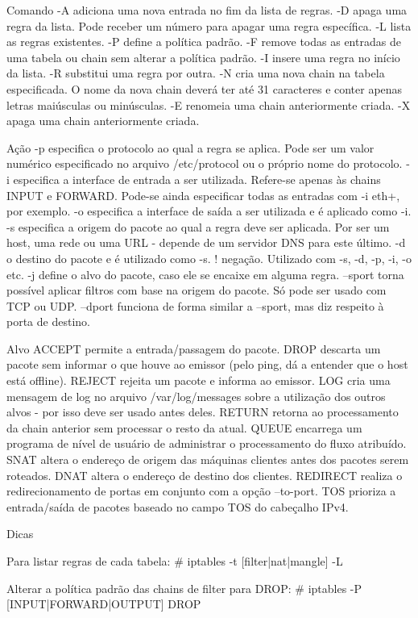 Comando
-A adiciona uma nova entrada no fim da lista de regras.
-D apaga uma regra da lista. Pode receber um número para apagar uma regra específica.
-L lista as regras existentes.
-P define a política padrão.
-F remove todas as entradas de uma tabela ou chain sem alterar a política padrão.
-I insere uma regra no início da lista.
-R substitui uma regra por outra.
-N cria uma nova chain na tabela especificada. O nome da nova chain deverá ter até 31 caracteres e conter apenas letras maiúsculas ou minúsculas.
-E renomeia uma chain anteriormente criada.
-X apaga uma chain anteriormente criada.

Ação
-p especifica o protocolo ao qual a regra se aplica. Pode ser um valor numérico especificado no arquivo /etc/protocol ou o próprio nome do protocolo.
-i especifica a interface de entrada a ser utilizada. Refere-se apenas às chains INPUT e FORWARD. Pode-se ainda especificar todas as entradas com -i eth+, por exemplo.
-o especifica a interface de saída a ser utilizada e é aplicado como -i.
-s especifica a origem do pacote ao qual a regra deve ser aplicada. Por ser um host, uma rede ou uma URL - depende de um servidor DNS para este último.
-d o destino do pacote e é utilizado como -s.
! negação. Utilizado com -s, -d, -p, -i, -o etc.
-j define o alvo do pacote, caso ele se encaixe em alguma regra.
--sport torna possível aplicar filtros com base na origem do pacote. Só pode ser usado com TCP ou UDP.
--dport funciona de forma similar a --sport, mas diz respeito à porta de destino.

Alvo
ACCEPT permite a entrada/passagem do pacote.
DROP descarta um pacote sem informar o que houve ao emissor (pelo ping, dá a entender que o host está offline).
REJECT rejeita um pacote e informa ao emissor.
LOG cria uma mensagem de log no arquivo /var/log/messages sobre a utilização dos outros alvos - por isso deve ser usado antes deles.
RETURN retorna ao processamento da chain anterior sem processar o resto da atual.
QUEUE encarrega um programa de nível de usuário de administrar o processamento do fluxo atribuído.
SNAT altera o endereço de origem das máquinas clientes antes dos pacotes serem roteados.
DNAT altera o endereço de destino dos clientes.
REDIRECT realiza o redirecionamento de portas em conjunto com a opção --to-port.
TOS prioriza a entrada/saída de pacotes baseado no campo TOS do cabeçalho IPv4.

Dicas

Para listar regras de cada tabela:
# iptables -t [filter|nat|mangle] -L

Alterar a política padrão das chains de filter para DROP:
# iptables -P [INPUT|FORWARD|OUTPUT] DROP

